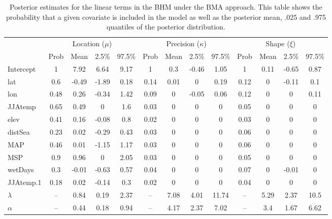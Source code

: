 \documentclass[11pt,english]{article}
\begin{document}
\begin{table}
\caption{Posterior estimates for the linear terms in the BHM under the BMA approach.  This table shows the probability that a given covariate is included in the model as well as the posterior mean, .025 and .975 quantiles of the posterior distribution.}\label{tab:linear_results}
\begin{center}
\begin{tabular}{l|c c c c|c c c c|c c c c}
\hline\hline
& \multicolumn{4}{c|}{Location ($\mu$)} & \multicolumn{4}{c|}{Precision ($\kappa$)} & \multicolumn{4}{c}{Shape ($\xi$)}\\
& Prob & Mean &2.5\% & 97.5\%& Prob & Mean &2.5\% & 97.5\%& Prob & Mean &2.5\% & 97.5\%\\
\hline
Intercept & 1 & 7.92 & 6.64 & 9.17 & 1 & 0.3 & -0.46 & 1.05 & 1 & 0.11 & -0.65 & 0.87\\
lat & 0.6 & -0.49 & -1.89 & 0.18 & 0.14 & 0.01 & 0 & 0.19 & 0.12 & 0 & -0.11 & 0.1\\
lon & 0.48 & 0.26 & -0.34 & 1.42 & 0.09 & 0 & -0.05 & 0.06 & 0.12 & 0 & 0 & 0.11\\
JJAtemp & 0.65 & 0.49 & 0 & 1.6 & 0.03 & 0 & 0 & 0 & 0.05 & 0 & 0 & 0\\
elev & 0.41 & 0.16 & -0.08 & 0.8 & 0.02 & 0 & 0 & 0 & 0.03 & 0 & 0 & 0\\
distSea & 0.23 & 0.02 & -0.29 & 0.43 & 0.03 & 0 & 0 & 0 & 0.06 & 0 & 0 & 0\\
MAP & 0.46 & 0.01 & -1.15 & 1.17 & 0.03 & 0 & 0 & 0 & 0.06 & 0 & 0 & 0\\
MSP & 0.9 & 0.96 & 0 & 2.05 & 0.03 & 0 & 0 & 0 & 0.05 & 0 & 0 & 0\\
wetDays & 0.3 & -0.01 & -0.63 & 0.57 & 0.04 & 0 & 0 & 0 & 0.07 & 0 & -0.01 & 0\\
JJAtemp.1 & 0.18 & 0.02 & -0.14 & 0.3 & 0.02 & 0 & 0 & 0 & 0.04 & 0 & 0 & 0\\
\hline
$\lambda$ & -- & 0.84 & 0.19 & 2.37 & -- & 7.08 & 4.01 & 11.74 & -- & 5.29 & 2.37 & 10.5\\
$\alpha$ & -- & 0.44 & 0.18 & 0.94 & -- & 4.17 & 2.37 & 7.02 & -- & 3.4 & 1.67 & 6.62\\
\hline\hline
\end{tabular}
\end{center}
\end{table}
\end{document}
